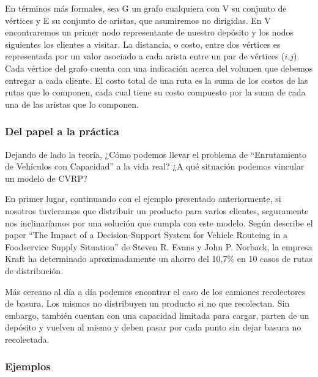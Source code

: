 En términos más formales, sea G un grafo cualquiera con V su conjunto de vértices y E su conjunto de aristas, que asumiremos no dirigidas. En V encontraremos un primer nodo representante de nuestro depósito y los nodos siguientes los clientes a visitar. La distancia, o costo, entre dos vértices es representada por un valor asociado a cada arista entre un par de vértices ($i$,$j$). Cada vértice del grafo cuenta con una indicación acerca del volumen que debemos entregar a cada cliente. El costo total de una ruta es la suma de los costos de las rutas que lo componen, cada cual tiene su costo compuesto por la suma de cada una de las aristas que lo componen.

\subsubsection{Del papel a la práctica}
Dejando de lado la teoría, ¿Cómo podemos llevar el problema de ``Enrutamiento de Vehículos con Capacidad'' a la vida real? ¿A qué situación podemos vincular un modelo de CVRP?

En primer lugar, continuando con el ejemplo presentado anteriormente, si nosotros tuvieramos que distribuir un producto para varios clientes, seguramente nos inclinaríamos por una solución que cumpla con este modelo. Según describe el paper ``The Impact of a Decision-Support System for Vehicle Routeing in a Foodservice Supply Situation'' de Steven R. Evans y John P. Norback, la empresa Kraft ha determinado aproximadamente un ahorro del 10,7\% en 10 casos de rutas de distribución.

Más cercano al día a día podemos encontrar el caso de los camiones recolectores de basura. Los mismos no distribuyen un producto si no que recolectan. Sin embargo, también cuentan con una capacidad limitada para cargar, parten de un depósito y vuelven al mismo y deben pasar por cada punto sin dejar basura no recolectada.

\subsubsection{Ejemplos}
